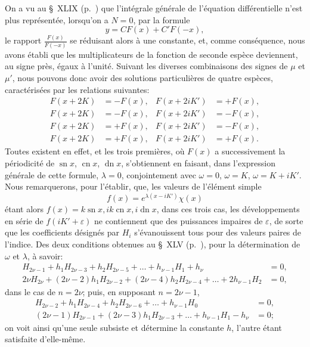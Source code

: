 \documentclass[11pt,leqno,oneside,letterpaper]{book}[2005/09/16]
\DeclareMathOperator{\sn}{sn}
\DeclareMathOperator{\cn}{cn}
\DeclareMathOperator{\dn}{dn}
\begin{document}
On a vu au \S~XLIX (p.~\pageref{page133}) que l'int\'egrale g\'en\'erale de l'\'equation
diff\'eren\-tielle n'est plus repr\'esent\'ee, lorsqu'on a $N = 0$, par la formule
\[
y = CF(x) + C'F(-x),
\]
le rapport $\frac{F(x)}{F(-x)}$ se r\'eduisant alors \`a une constante, et, comme cons\'equence,
nous avons \'etabli que les multiplicateurs de la fonction de seconde
esp\`ece deviennent, au signe pr\`es, \'egaux \`a l'unit\'e. Suivant les diverses
combinaisons des signes de $\mu$ et $\mu'$, nous pouvons donc avoir des solutions
particuli\`eres de quatre esp\`eces, caract\'eris\'ees par les relations suivantes:
\begin{align*}
\tag*{(I)}  F(x+2K) &= -F(x),  & F(x+2iK') &= +F(x), \\
\tag*{(II)} F(x+2K) &= -F(x),  & F(x+2iK') &= -F(x), \\
\tag*{(III)}F(x+2K) &= +F(x),  & F(x+2iK') &= -F(x), \\
\tag*{(IV)} F(x+2K) &= +F(x),  & F(x+2iK') &= +F(x).
\end{align*}
Toutes existent en effet, et les trois premi\`eres, o\`u $F(x)$ a successivement la
p\'eriodicit\'e de $\sn x$, $\cn x$, $\dn x$, s'obtiennent en faisant, dans l'expression
g\'en\'erale de cette formule, $\lambda = 0$, conjointement avec $\omega=0$, $\omega=K$,
$\omega=K+iK'$. Nous remarquerons, pour l'\'etablir, que, les valeurs de l'\'el\'ement
simple
\[
f(x) = e^{\lambda(x-iK')} \chi(x)
\]
\'etant alors $f(x) = k\sn x, ik\cn x, i\dn x$, dans ces trois cas, les d\'eveloppe\-ments
en s\'erie de $f(iK'+ \varepsilon)$ ne contiennent que des puissances impaires
de $\varepsilon$, de sorte que les coefficients d\'esign\'es par $H_i$ s'\'evanouissent tous pour
des valeurs paires de l'indice. Des deux conditions obtenues au \S~XLV
(p.~\pageref{page123}), pour la d\'etermination de $\omega$ et
$\lambda$, \`a savoir:
\begin{align*}
H_{2\nu-1} + h_1 H_{2\nu-3} + h_2 H_{2\nu-5} + \ldots + h_{\nu-1} H_1 + h_{\nu} &= 0,\\
2\nu H_{2\nu} + (2\nu - 2)h_1 H_{2\nu-2} + (2\nu-4)h_2 H_{2\nu-4} + \ldots + 2h_{\nu-1} H_2 &= 0,
\end{align*}
dans le cas de $n=2\nu$; puis, en supposant $n=2\nu - 1$,
\begin{align*}
H_{2\nu-2} + h_1 H_{2\nu-4} + h_2 H_{2\nu-6} + \ldots + h_{\nu-1} H_0 &= 0,\\
(2\nu-1) H_{2\nu-1} + (2\nu-3) h_1 H_{2\nu-3} + \ldots + h_{\nu-1} H_1 - h_{\nu} &= 0;
\end{align*}
on voit ainsi qu'une seule subsiste et d\'etermine la constante $h$, l'autre \'etant
satisfaite d'elle-m\^eme.
\end{document}
